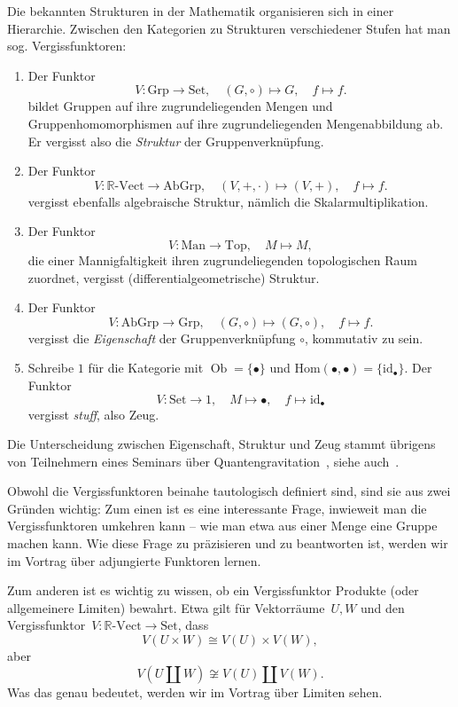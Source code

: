 \documentclass[a4paper,ngerman]{scrartcl}
\theoremstyle{definition}
\theoremstyle{plain}
\theoremstyle{remark}
\newcommand{\RR}{\mathbb{R}}
\newcommand{\Hom}{\mathrm{Hom}}
\newcommand{\id}{\mathrm{id}}
\DeclareMathOperator{\Ob}{Ob}
\newcommand{\Set}{\mathrm{Set}}
\newcommand{\Grp}{\mathrm{Grp}}
\newcommand{\Vect}{\mathrm{Vect}}
\newcommand{\AbGrp}{\mathrm{AbGrp}}
\newcommand{\Man}{\mathrm{Man}}
\newcommand{\Top}{\mathrm{Top}}
\begin{document}
Die bekannten Strukturen in der Mathematik organisieren sich in einer
Hierarchie. Zwischen den Kategorien zu Strukturen verschiedener Stufen hat man sog.
Vergissfunktoren:

\begin{enumerate}
  \item Der Funktor
  \[ V : \Grp \to \Set, \quad (G,\circ) \mapsto G, \quad f \mapsto f. \]
  bildet Gruppen auf ihre zugrundeliegenden Mengen und Gruppenhomomorphismen
  auf ihre zugrundeliegenden Mengenabbildung ab. Er vergisst also die
  \emph{Struktur} der Gruppenverknüpfung.
  \item Der Funktor
  \[ V : \RR\text{-}\Vect \to \AbGrp, \quad (V,+,\cdot) \mapsto (V,+), \quad f \mapsto f. \]
  vergisst ebenfalls algebraische Struktur, nämlich die Skalarmultiplikation.
  \item Der Funktor
  \[ V : \Man \to \Top, \quad M \mapsto M, \]
  die einer Mannigfaltigkeit ihren zugrundeliegenden topologischen Raum
  zuordnet, vergisst (differentialgeometrische) Struktur.
  \item Der Funktor
  \[ V : \AbGrp \to \Grp, \quad (G,\circ) \mapsto (G,\circ), \quad f \mapsto f. \]
  vergisst die \emph{Eigenschaft} der Gruppenverknüpfung $\circ$, kommutativ zu sein.
  \item Schreibe $1$ für die Kategorie mit $\Ob = \lbrace \bullet \rbrace$ und $\Hom(\bullet,\bullet) = \lbrace \id_\bullet \rbrace$. Der Funktor
  \[ V : \Set \to 1, \quad M \mapsto \bullet, \quad f \mapsto \id_\bullet \]
  vergisst \emph{stuff}, also Zeug.
\end{enumerate}

Die Unterscheidung zwischen Eigenschaft, Struktur und Zeug stammt übrigens
von Teilnehmern eines Seminars über
Quantengravitation~\cite[Abschn.~2.4]{lectures-on-n-categories}, siehe
auch~\cite{ncatlab:stuff}.

Obwohl die Vergissfunktoren beinahe tautologisch definiert sind, sind sie aus
zwei Gründen wichtig: Zum einen ist es eine interessante Frage, inwieweit
man die Vergissfunktoren umkehren kann -- wie man etwa aus einer Menge eine
Gruppe machen kann. Wie diese Frage zu präzisieren und zu beantworten ist,
werden wir im Vortrag über adjungierte Funktoren lernen.

Zum anderen ist es wichtig zu wissen, ob ein Vergissfunktor Produkte (oder
allgemeinere Limiten) bewahrt. Etwa gilt für Vektorräume~$U, W$ und den
Vergissfunktor~$V:\RR\text{-}\Vect \to \Set$, dass
\[ V(U \times W) \cong V(U) \times V(W), \]
aber
\[ V(U \amalg W) \not\cong V(U) \amalg V(W). \]
Was das genau bedeutet, werden wir im Vortrag über Limiten sehen.
\end{document}
